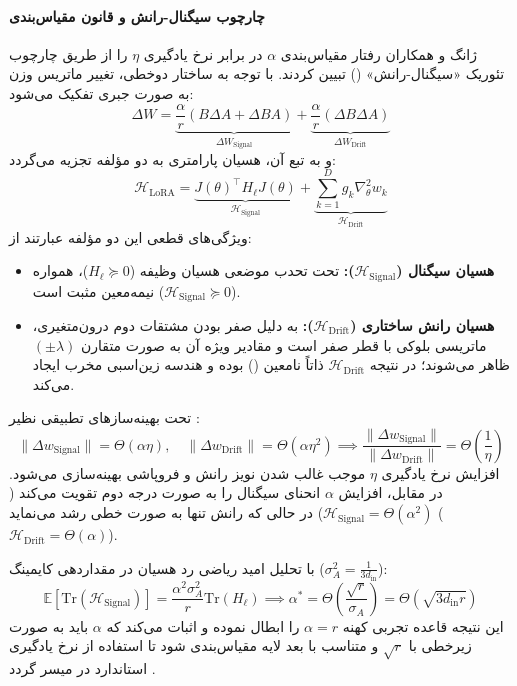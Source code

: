\paragraph*{چارچوب سیگنال-رانش و قانون مقیاس‌بندی }
ژانگ و همکاران \cite{zhang2026hidden} رفتار مقیاس‌بندی $\alpha$ در برابر نرخ یادگیری $\eta$ را از طریق چارچوب تئوریک «سیگنال-رانش» () تبیین کردند. با توجه به ساختار دوخطی، تغییر ماتریس وزن به صورت جبری تفکیک می‌شود:
\begin{equation}
    \Delta W = \underbrace{\frac{\alpha}{r}(B \Delta A + \Delta B A)}_{\Delta W_{\text{Signal}}} + \underbrace{\frac{\alpha}{r}(\Delta B \Delta A)}_{\Delta W_{\text{Drift}}}
\end{equation}
و به تبع آن، هسیان پارامتری به دو مؤلفه تجزیه می‌گردد:
\begin{equation}
    \mathcal{H}_{\text{LoRA}} = \underbrace{J(\theta)^\top H_\ell J(\theta)}_{\mathcal{H}_{\text{Signal}}} + \underbrace{\sum_{k=1}^D g_k \nabla_\theta^2 w_k}_{\mathcal{H}_{\text{Drift}}}
\end{equation}
ویژگی‌های قطعی این دو مؤلفه عبارتند از:
\begin{itemize}
    \item \textbf{هسیان سیگنال ($\mathcal{H}_{\text{Signal}}$):} تحت تحدب موضعی هسیان وظیفه ($H_\ell \succeq 0$)، همواره نیمه‌معین مثبت است ($\mathcal{H}_{\text{Signal}} \succeq 0$).
    \item \textbf{هسیان رانش ساختاری ($\mathcal{H}_{\text{Drift}}$):} به دلیل صفر بودن مشتقات دوم درون‌متغیری، ماتریسی بلوکی با قطر صفر است و مقادیر ویژه آن به صورت متقارن $(\pm \lambda)$ ظاهر می‌شوند؛ در نتیجه $\mathcal{H}_{\text{Drift}}$ ذاتاً نامعین () بوده و هندسه زین‌اسبی مخرب ایجاد می‌کند.
\end{itemize}

تحت بهینه‌سازهای تطبیقی نظیر :
\begin{equation}
    \|\Delta w_{\text{Signal}}\| = \Theta(\alpha \eta), \quad \|\Delta w_{\text{Drift}}\| = \Theta(\alpha \eta^2) \implies \frac{\|\Delta w_{\text{Signal}}\|}{\|\Delta w_{\text{Drift}}\|} = \Theta\left(\frac{1}{\eta}\right)
\end{equation}
افزایش نرخ یادگیری $\eta$ موجب غالب شدن نویز رانش و فروپاشی بهینه‌سازی می‌شود. در مقابل، افزایش $\alpha$ انحنای سیگنال را به صورت درجه دوم تقویت می‌کند ($\mathcal{H}_{\text{Signal}} = \Theta(\alpha^2)$) در حالی که رانش تنها به صورت خطی رشد می‌نماید ($\mathcal{H}_{\text{Drift}} = \Theta(\alpha)$).

با تحلیل امید ریاضی رد هسیان در مقداردهی کایمینگ ($\sigma_A^2 = \frac{1}{3d_{\text{in}}}$):
\begin{equation}
    \mathbb{E}[\text{Tr}(\mathcal{H}_{\text{Signal}})] = \frac{\alpha^2 \sigma_A^2}{r} \text{Tr}(H_\ell) \implies \alpha^* = \Theta\left(\frac{\sqrt{r}}{\sigma_A}\right) = \Theta\left(\sqrt{3 d_{\text{in}} r}\right)
\end{equation}
این نتیجه قاعده تجربی کهنه $\alpha = r$ را ابطال نموده و اثبات می‌کند که $\alpha$ باید به صورت زیرخطی با $\sqrt{r}$ و متناسب با بعد لایه مقیاس‌بندی شود تا استفاده از نرخ یادگیری استاندارد  در  میسر گردد \cite{zhang2026hidden}.

